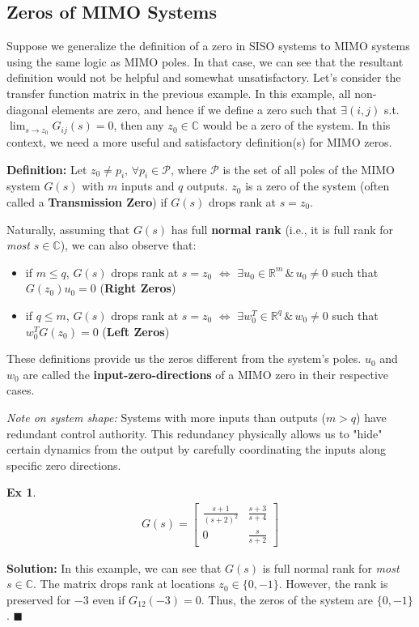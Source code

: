 \documentclass[twoside]{article}
\newtheorem{exmp}[theorem]{Ex}
\begin{document}
\subsection{Zeros of MIMO Systems}

Suppose we generalize the definition of a zero in SISO systems to MIMO systems using the same logic as MIMO poles. In that case, we can see that the resultant definition would not be helpful and somewhat unsatisfactory. Let's consider the transfer function matrix in the previous example. In this example, all non-diagonal elements are zero, and hence if we define a zero such that $\exists (i,j)$ s.t. $\lim_{s \to z_0}G_{ij}(s) = 0$, then any $z_0 \in \mathbb{C}$ would be a zero of the system. In this context, we need a more useful and satisfactory definition(s) for MIMO zeros.

\textbf{Definition:} Let $z_0 \neq p_i , \, \forall p_i \in \mathcal{P}$, where $\mathcal{P}$ is the set of all poles of the MIMO system $G(s)$ with $m$ inputs and
$q$ outputs. $z_0$ is a zero of the system (often called a \textbf{Transmission Zero}) if $G(s)$ drops rank at $s = z_0$.

Naturally, assuming that $G(s)$ has full \textbf{normal rank} (i.e., it is full rank for \textit{most} $s \in \mathbb{C}$), we can also observe that:
\begin{itemize}
\item if $m \leq q$, $G(s)$ drops rank at $s = z_0$ $\iff$ $\exists u_0 \in \mathbb{R}^{m} \, \& \, u_0 \neq 0$ such that $G(z_0) u_0 = 0$ (\textbf{Right Zeros})
\item if $q \leq m$, $G(s)$ drops rank at $s = z_0$ $\iff$ $\exists w_0^T \in \mathbb{R}^{q} \, \& \, w_0 \neq 0$ such that $w_0^T G(z_0) = 0$ (\textbf{Left Zeros})
\end{itemize}

These definitions provide us the zeros different from the system's poles. $u_0$ and $w_0$ are called the \textbf{input-zero-directions} of a MIMO zero in their respective cases. 

\textit{Note on system shape:} Systems with more inputs than outputs ($m > q$) have redundant control authority. This redundancy physically allows us to "hide" certain dynamics from the output by carefully coordinating the inputs along specific zero directions.
%
\begin{exmp}
	\begin{align*}
	G(s) = \begin{bmatrix} \frac{s+1}{(s+2)^2} & \frac{s+3}{s+4}  \\  
	0 & \frac{s}{s+2}  \end{bmatrix}
	\end{align*}
\end{exmp}
%
\textbf{Solution:} In this example, we can see that $G(s)$ is full normal rank for \textit{most} $s \in \mathbb{C}$. The matrix drops rank at locations
$z_0 \in \lbrace 0 , -1 \rbrace$. However, the rank is preserved for $-3$ even if $G_{12}(-3) = 0$. Thus, the zeros of the system are $\lbrace 0 , -1 \rbrace$. \hfill $\blacksquare$
\end{document}
